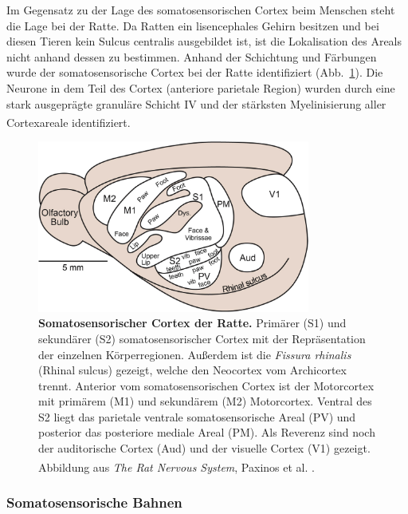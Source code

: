 Im Gegensatz zu der Lage des somatosensorischen Cortex beim Menschen steht die Lage bei der Ratte. Da Ratten ein lisencephales Gehirn besitzen und bei diesen Tieren kein Sulcus centralis ausgebildet ist, ist die Lokalisation des Areals nicht anhand dessen zu bestimmen. Anhand der Schichtung und Färbungen wurde der somatosensorische Cortex bei der Ratte identifiziert (Abb.~\ref{fig:S1_Cortex_Ratte}). Die Neurone in dem Teil des Cortex (anteriore parietale Region) wurden durch eine stark ausgeprägte granuläre Schicht IV und der stärksten Myelinisierung aller Cortexareale identifiziert. \textsuperscript{\cite[Kap.~22]{paxinos2014rat}}
\\
\begin{figure}[H]
    \centering
    \includegraphics[width = 0.8\textwidth] {pictures/somatosensory/Somato_cortex_ratte.png}
    \caption[Somatosensorischer Cortex der Ratte]{\textbf{Somatosensorischer Cortex der Ratte.} Primärer (S1) und sekundärer (S2) somatosensorischer Cortex mit der Repräsentation der einzelnen Körperregionen. Außerdem ist die \textit{Fissura rhinalis} (Rhinal sulcus) gezeigt, welche den Neocortex vom Archicortex trennt. Anterior vom somatosensorischen Cortex ist der Motorcortex mit primärem (M1) und sekundärem (M2) Motorcortex. Ventral des S2 liegt das parietale ventrale somatosensorische Areal (PV) und posterior das posteriore mediale Areal (PM). Als Reverenz sind noch der auditorische Cortex (Aud) und der visuelle Cortex (V1) gezeigt. Abbildung aus \textit{The Rat Nervous System}, Paxinos et al. \textsuperscript{\cite[Kap.~24]{paxinos2014rat}}.}
    \label{fig:S1_Cortex_Ratte}
\end{figure}

\subsubsection*{Somatosensorische Bahnen}

